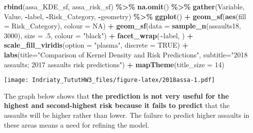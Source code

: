 \documentclass[
]{article}
\newenvironment{Shaded}{\begin{snugshade}}{\end{snugshade}}
\newcommand{\AttributeTok}[1]{\textcolor[rgb]{0.13,0.29,0.53}{#1}}
\newcommand{\ConstantTok}[1]{\textcolor[rgb]{0.56,0.35,0.01}{#1}}
\newcommand{\DecValTok}[1]{\textcolor[rgb]{0.00,0.00,0.81}{#1}}
\newcommand{\FunctionTok}[1]{\textcolor[rgb]{0.13,0.29,0.53}{\textbf{#1}}}
\newcommand{\NormalTok}[1]{#1}
\newcommand{\SpecialCharTok}[1]{\textcolor[rgb]{0.81,0.36,0.00}{\textbf{#1}}}
\newcommand{\StringTok}[1]{\textcolor[rgb]{0.31,0.60,0.02}{#1}}
\begin{document}
\begin{Shaded}
\begin{Highlighting}[]
\FunctionTok{rbind}\NormalTok{(assa\_KDE\_sf, assa\_risk\_sf) }\SpecialCharTok{\%\textgreater{}\%}
  \FunctionTok{na.omit}\NormalTok{() }\SpecialCharTok{\%\textgreater{}\%}
  \FunctionTok{gather}\NormalTok{(Variable, Value, }\SpecialCharTok{{-}}\NormalTok{label, }\SpecialCharTok{{-}}\NormalTok{Risk\_Category, }\SpecialCharTok{{-}}\NormalTok{geometry) }\SpecialCharTok{\%\textgreater{}\%}
  \FunctionTok{ggplot}\NormalTok{() }\SpecialCharTok{+}
    \FunctionTok{geom\_sf}\NormalTok{(}\FunctionTok{aes}\NormalTok{(}\AttributeTok{fill =}\NormalTok{ Risk\_Category), }\AttributeTok{colour =} \ConstantTok{NA}\NormalTok{) }\SpecialCharTok{+}
    \FunctionTok{geom\_sf}\NormalTok{(}\AttributeTok{data =} \FunctionTok{sample\_n}\NormalTok{(assaults18, }\DecValTok{3000}\NormalTok{), }\AttributeTok{size =}\NormalTok{ .}\DecValTok{5}\NormalTok{, }\AttributeTok{colour =} \StringTok{"black"}\NormalTok{) }\SpecialCharTok{+}
    \FunctionTok{facet\_wrap}\NormalTok{(}\SpecialCharTok{\textasciitilde{}}\NormalTok{label, ) }\SpecialCharTok{+}
    \FunctionTok{scale\_fill\_viridis}\NormalTok{(}\AttributeTok{option =} \StringTok{"plasma"}\NormalTok{, }\AttributeTok{discrete =} \ConstantTok{TRUE}\NormalTok{) }\SpecialCharTok{+}
    \FunctionTok{labs}\NormalTok{(}\AttributeTok{title=}\StringTok{"Comparison of Kernel Density and Risk Predictions"}\NormalTok{,}
         \AttributeTok{subtitle=}\StringTok{"2018 assaults; 2017 assaults risk predictions"}\NormalTok{) }\SpecialCharTok{+}
    \FunctionTok{mapTheme}\NormalTok{(}\AttributeTok{title\_size =} \DecValTok{14}\NormalTok{)}
\end{Highlighting}
\end{Shaded}

\texttt{[image: Indriaty\_TututHW3\_files/figure-latex/2018assa-1.pdf]}

The graph below shows that \textbf{the prediction is not very useful for
the highest and second-highest risk because it fails to predict} that
the assaults will be higher rather than lower. The failure to predict
higher assaults in these areas means a need for refining the model.
\end{document}
